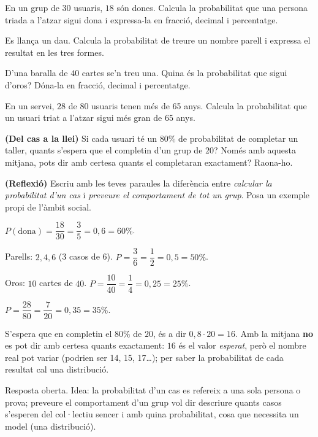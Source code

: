 \begin{exercicis}
\begin{exlist}
  \item En un grup de $30$ usuaris, $18$ són dones. Calcula la probabilitat que una
        persona triada a l'atzar sigui dona i expressa-la en fracció, decimal i
        percentatge.
  \item Es llança un dau. Calcula la probabilitat de treure un nombre parell i expressa
        el resultat en les tres formes.
  \item D'una baralla de $40$ cartes se'n treu una. Quina és la probabilitat que sigui
        d'oros? Dóna-la en fracció, decimal i percentatge.
  \item En un servei, $28$ de $80$ usuaris tenen més de 65 anys. Calcula la probabilitat
        que un usuari triat a l'atzar sigui més gran de 65 anys.
  \item \textbf{(Del cas a la llei)} Si cada usuari té un $80\%$ de probabilitat de
        completar un taller, quants s'espera que el completin d'un grup de $20$? Només
        amb aquesta mitjana, pots dir amb certesa quants el completaran exactament?
        Raona-ho.
  \item \textbf{(Reflexió)} Escriu amb les teves paraules la diferència entre
        \emph{calcular la probabilitat d'un cas} i \emph{preveure el comportament de tot
        un grup}. Posa un exemple propi de l'àmbit social.
\end{exlist}
\end{exercicis}

\begin{solucions}
\begin{sollist}
  \item $P(\text{dona})=\dfrac{18}{30}=\dfrac{3}{5}=0,6=60\%$.
  \item Parells: $2,4,6$ (3 casos de 6). $P=\dfrac{3}{6}=\dfrac{1}{2}=0,5=50\%$.
  \item Oros: $10$ cartes de $40$. $P=\dfrac{10}{40}=\dfrac{1}{4}=0,25=25\%$.
  \item $P=\dfrac{28}{80}=\dfrac{7}{20}=0,35=35\%$.
  \item S'espera que en completin el $80\%$ de $20$, és a dir $0,8\cdot 20=16$. Amb la
        mitjana \textbf{no} es pot dir amb certesa quants exactament: $16$ és el valor
        \emph{esperat}, però el nombre real pot variar (podrien ser 14, 15, 17\ldots);
        per saber la probabilitat de cada resultat cal una distribució.
  \item Resposta oberta. Idea: la probabilitat d'un cas es refereix a una sola persona o
        prova; preveure el comportament d'un grup vol dir descriure quants casos
        s'esperen del col·lectiu sencer i amb quina probabilitat, cosa que necessita un
        model (una distribució).
\end{sollist}
\end{solucions}

